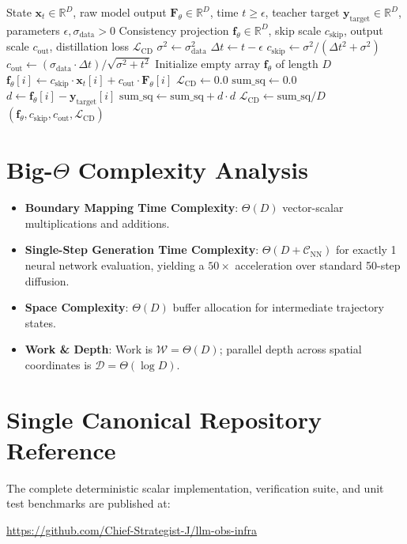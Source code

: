 \documentclass[11pt,a4paper]{article}
\theoremstyle{definition}
\begin{document}
\begin{algorithm}[H]
\caption{Consistency Model Boundary Parameterization and Distillation Loss}
\begin{algorithmic}[1]
\Require State $\mathbf{x}_t \in \mathbb{R}^D$, raw model output $\mathbf{F}_\theta \in \mathbb{R}^D$, time $t \ge \epsilon$, teacher target $\mathbf{y}_{\text{target}} \in \mathbb{R}^D$, parameters $\epsilon, \sigma_{\text{data}} > 0$
\Ensure Consistency projection $\mathbf{f}_\theta \in \mathbb{R}^D$, skip scale $c_{\text{skip}}$, output scale $c_{\text{out}}$, distillation loss $\mathcal{L}_{\text{CD}}$
\State $\sigma^2 \gets \sigma_{\text{data}}^2$
\State $\Delta t \gets t - \epsilon$
\State $c_{\text{skip}} \gets \sigma^2 / (\Delta t^2 + \sigma^2)$
\State $c_{\text{out}} \gets (\sigma_{\text{data}} \cdot \Delta t) / \sqrt{\sigma^2 + t^2}$
\State Initialize empty array $\mathbf{f}_\theta$ of length $D$
    \State $\mathbf{f}_\theta[i] \gets c_{\text{skip}} \cdot \mathbf{x}_t[i] + c_{\text{out}} \cdot \mathbf{F}_\theta[i]$
\EndFor
\State $\mathcal{L}_{\text{CD}} \gets 0.0$
    \State $\text{sum\_sq} \gets 0.0$
        \State $d \gets \mathbf{f}_\theta[i] - \mathbf{y}_{\text{target}}[i]$
        \State $\text{sum\_sq} \gets \text{sum\_sq} + d \cdot d$
    \EndFor
    \State $\mathcal{L}_{\text{CD}} \gets \text{sum\_sq} / D$
\EndIf
\State \Return $(\mathbf{f}_\theta, c_{\text{skip}}, c_{\text{out}}, \mathcal{L}_{\text{CD}})$
\end{algorithmic}
\end{algorithm}

\section{Big-$\Theta$ Complexity Analysis}

\begin{itemize}
    \item \textbf{Boundary Mapping Time Complexity}: $\Theta(D)$ vector-scalar multiplications and additions.
    \item \textbf{Single-Step Generation Time Complexity}: $\Theta(D + \mathcal{C}_{\text{NN}})$ for exactly 1 neural network evaluation, yielding a $50\times$ acceleration over standard 50-step diffusion.
    \item \textbf{Space Complexity}: $\Theta(D)$ buffer allocation for intermediate trajectory states.
    \item \textbf{Work \& Depth}: Work is $\mathcal{W} = \Theta(D)$; parallel depth across spatial coordinates is $\mathcal{D} = \Theta(\log D)$.
\end{itemize}

\section{Single Canonical Repository Reference}

The complete deterministic scalar implementation, verification suite, and unit test benchmarks are published at:
\begin{center}
\url{https://github.com/Chief-Strategist-J/llm-obs-infra}
\end{center}
\end{document}
